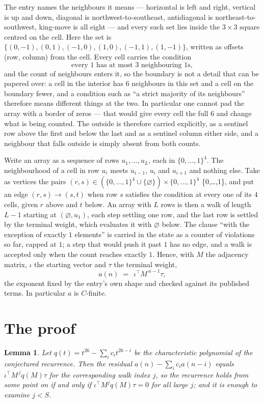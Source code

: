 \documentclass[11pt,a4paper]{article}
\theoremstyle{plain}
\newtheorem{lemma}[theorem]{Lemma}
\theoremstyle{definition}
\begin{document}
The entry names the neighbours it means --- horizontal is left and right, vertical is up and
down, diagonal is northwest-to-southeast, antidiagonal is northeast-to-southwest, king-move is
all eight --- and every such set lies inside the $3\times3$ square centred on the cell. Here
the set is $\{(0,-1), (0,1), (-1,0), (1,0), (-1,1), (1,-1)\}$, written as offsets (row, column) from the cell. Every cell carries
the condition
\[
\text{every 1 has at most 3 neighbouring 1s},
\]
and the count of neighbours enters it, so the boundary is not a detail that can be papered
over: a cell in the interior has $6$ neighbours in this set and a cell on the boundary
fewer, and a condition such as ``a strict majority of its neighbours'' therefore means
different things at the two. In particular one cannot pad the array with a border of zeros ---
that would give every cell the full $6$ and change what is being counted. The outside is
therefore carried
explicitly, as a sentinel row above the first and below the last and as a sentinel column
either side, and a neighbour that falls outside is simply absent from both counts.

Write an array as a sequence of rows $u_1,\dots,u_L$, each in
$\{0,\dots,1\}^{4}$. The neighbourhood of a cell in row $u_i$ meets $u_{i-1}$,
$u_i$ and $u_{i+1}$ and nothing else. Take as vertices the pairs
$(r,s)\in(\{0,\dots,1\}^{4}\cup\{\varnothing\})\times\{0,\dots,1\}^{4}$ \times \{0,\dots,1\},
and put an edge $(r,s)\to(s,t)$ when row $s$ satisfies the condition at every one of its
$4$ cells, given $r$ above and $t$ below. An array with $L$ rows is then a walk of length
$L-1$ starting at $(\varnothing,u_1)$, each step settling one row, and the last row is
settled by the terminal weight, which evaluates it with $\varnothing$ below. The clause ``with the exception of exactly $1$ elements'' is carried in
the state as a counter of violations so far, capped at $1$; a step that would push it past
$1$ has no edge, and a walk is accepted only when the count reaches exactly $1$. Hence,
with $M$ the adjacency matrix, $\iota$ the starting vector and $\tau$ the terminal weight,
\[
a(n)\;=\;\,\iota^{\!\top}M^{\,n-1}\tau ,
\]
the exponent fixed by the entry's own shape and checked against its published terms. In
particular $a$ is $C$-finite.

\section{The proof}

\begin{lemma}\label{lem:crit}
Let $q(t)=t^{26}-\sum_i c_it^{26-i}$ be the characteristic polynomial of the
conjectured recurrence. Then the residual $a(n)-\sum_ic_ia(n-i)$ equals
$\iota^{\!\top}M^{\,j}q(M)\tau$ for the corresponding walk index $j$, so the
recurrence holds from some point on if and only if $\iota^{\!\top}M^{j}q(M)\tau=0$ for all
large $j$; and it is enough to examine $j<S$.
\end{lemma}
\end{document}
